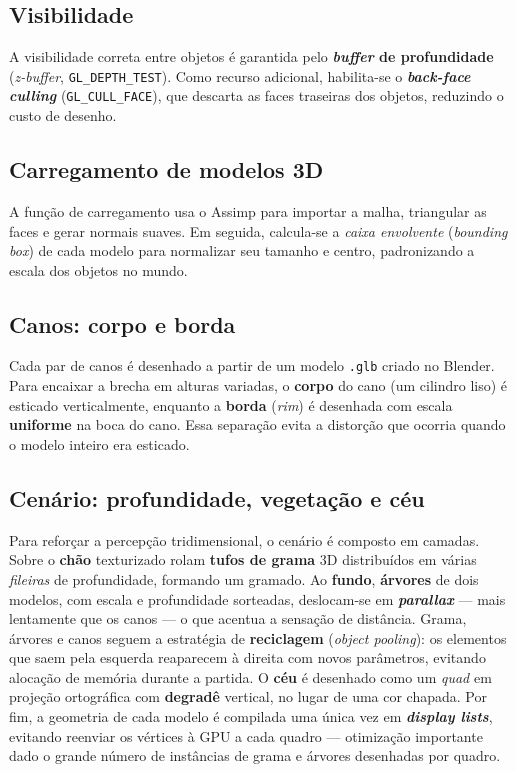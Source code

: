 \documentclass[12pt]{article}
\begin{document}
\subsection{Visibilidade}
A visibilidade correta entre objetos é garantida pelo \textbf{\emph{buffer}
de profundidade} (\emph{z-buffer}, \texttt{GL\_DEPTH\_TEST}). Como recurso
adicional, habilita-se o \textbf{\emph{back-face culling}}
(\texttt{GL\_CULL\_FACE}), que descarta as faces traseiras dos objetos,
reduzindo o custo de desenho.

\subsection{Carregamento de modelos 3D}
A função de carregamento usa o Assimp para importar a malha, triangular as
faces e gerar normais suaves. Em seguida, calcula-se a \emph{caixa
envolvente} (\emph{bounding box}) de cada modelo para normalizar seu tamanho
e centro, padronizando a escala dos objetos no mundo.

\subsection{Canos: corpo e borda}
Cada par de canos é desenhado a partir de um modelo \texttt{.glb} criado no
Blender. Para encaixar a brecha em alturas variadas, o \textbf{corpo} do
cano (um cilindro liso) é esticado verticalmente, enquanto a \textbf{borda}
(\emph{rim}) é desenhada com escala \textbf{uniforme} na boca do cano. Essa
separação evita a distorção que ocorria quando o modelo inteiro era
esticado.

\subsection{Cenário: profundidade, vegetação e céu}
Para reforçar a percepção tridimensional, o cenário é composto em camadas.
Sobre o \textbf{chão} texturizado rolam \textbf{tufos de grama} 3D
distribuídos em várias \emph{fileiras} de profundidade, formando um gramado.
Ao \textbf{fundo}, \textbf{árvores} de dois modelos, com escala e
profundidade sorteadas, deslocam-se em \textbf{\emph{parallax}} --- mais
lentamente que os canos --- o que acentua a sensação de distância. Grama,
árvores e canos seguem a estratégia de \textbf{reciclagem}
(\emph{object pooling}): os elementos que saem pela esquerda reaparecem à
direita com novos parâmetros, evitando alocação de memória durante a
partida. O \textbf{céu} é desenhado como um \emph{quad} em projeção
ortográfica com \textbf{degradê} vertical, no lugar de uma cor chapada. Por
fim, a geometria de cada modelo é compilada uma única vez em
\textbf{\emph{display lists}}, evitando reenviar os vértices à GPU a cada
quadro --- otimização importante dado o grande número de instâncias de grama
e árvores desenhadas por quadro.
\end{document}
